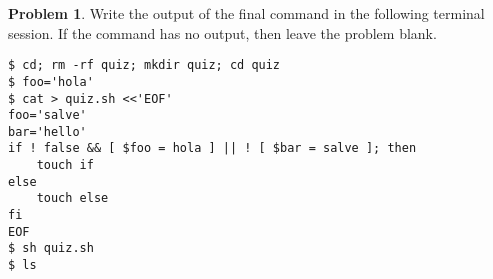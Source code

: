 \documentclass[10pt]{article}
\theoremstyle{definition}
\newtheorem{problem}{Problem}
\begin{document}
\filbreak
\begin{problem}
    Write the output of the final command in the following terminal session.
    If the command has no output, then leave the problem blank.
\end{problem}
\begin{lstlisting}
$ cd; rm -rf quiz; mkdir quiz; cd quiz
$ foo='hola'
$ cat > quiz.sh <<'EOF'
foo='salve'
bar='hello'
if ! false && [ $foo = hola ] || ! [ $bar = salve ]; then
    touch if
else
    touch else
fi
EOF
$ sh quiz.sh
$ ls
\end{lstlisting}
\end{document}
